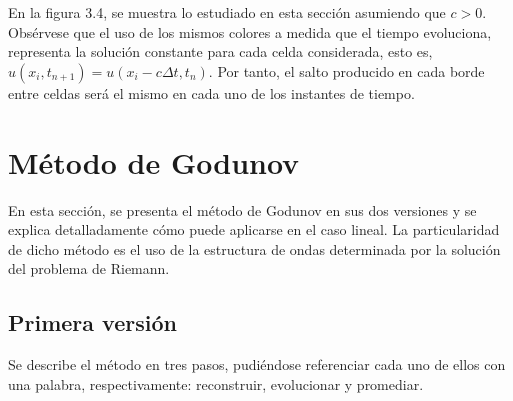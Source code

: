 En la figura 3.4, se muestra lo estudiado en esta sección asumiendo
que $c>0$.
Obsérvese que el uso de los mismos colores a medida que el tiempo
evoluciona, representa la solución constante para cada celda
considerada, esto es,
\begin{math}
  u
  \left(
  x_{i},
  t_{n+1}
  \right)=
  u
  \left(
  x_{i}-c\Delta t,
  t_{n}
  \right)
\end{math}.
Por tanto, el salto producido en cada borde entre celdas será el
mismo en cada uno de los instantes de tiempo.

\section{Método de Godunov}

En esta sección, se presenta el método de Godunov en sus dos
versiones y se explica detalladamente cómo puede aplicarse en el
caso lineal.
La particularidad de dicho método es el uso de la estructura de ondas
determinada por la solución del problema de Riemann.

\subsection{Primera versión}

Se describe el método en tres pasos, pudiéndose referenciar cada uno
de ellos con una palabra, respectivamente: reconstruir, evolucionar
y promediar.

